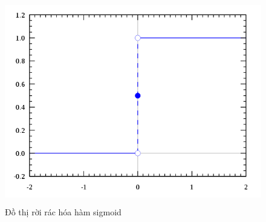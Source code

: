 \begin{figure}[h!]
\centering
\includegraphics[height=3.5in, keepaspectratio=true]{step.png}
\caption{Đồ thị rời rác hóa hàm sigmoid}
\end{figure}\\

